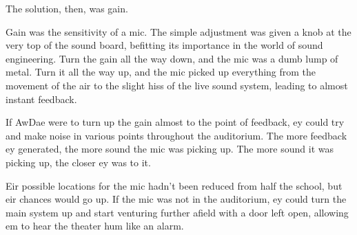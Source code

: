 The solution, then, was gain.

Gain was the sensitivity of a mic.  The simple adjustment was given a knob at the very top of the sound board, befitting its importance in the world of sound engineering.  Turn the gain all the way down, and the mic was a dumb lump of metal. Turn it all the way up, and the mic picked up everything from the movement of the air to the slight hiss of the live sound system, leading to almost instant feedback.

If AwDae were to turn up the gain almost to the point of feedback, ey could try and make noise in various points throughout the auditorium.  The more feedback ey generated, the more sound the mic was picking up.  The more sound it was picking up, the closer ey was to it.

Eir possible locations for the mic hadn't been reduced from half the school, but eir chances would go up.  If the mic was not in the auditorium, ey could turn the main system up and start venturing further afield with a door left open, allowing em to hear the theater hum like an alarm.
